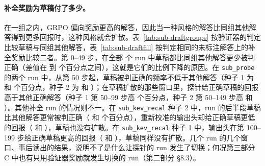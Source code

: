 \paragraph{补全奖励为草稿付了多少。} 在一组之内，GRPO 偏向奖励更高的解答，因此当一种风格的解答比同组其他解答得到更多回报时，这种风格就会扩散。表~\ref{tab:sub-draftgroups} 按验证器的判定比较草稿与同组其他解答，表~\ref{tab:sub-draftfill} 按判定相同的未标注解答上的补全奖励比较二者。第 0--49 步，在全部  个 run 中草稿都比同组其他解答更少被判正确（差值在  到  个百分点之间），这就是它们的比例下降的原因。在 \texttt{sub\_probe} 的两个 run 中，从第 50 步起，草稿被判正确的频率不低于其他解答（种子 1 为  和  个百分点，种子 2 为  和 ）；在草稿扩散的那些窗口里，探针给正确草稿的回报高于其他正确解答（种子 1 第 50--99 步高  个百分点，种子 2 第 50--149 步高  和 ）。其他补全 run 的情况则不一。在 \texttt{sub\_kev\_recal} 种子 2 中，run 的后半段草稿比其他解答更常被判正确（ 和  个百分点），重新校准的输出头却给正确草稿更低的回报（ 和 ），草稿也没有扩散。在 \texttt{sub\_kev\_recal} 种子 1 中，输出头在第 100--199 步给正确草稿更高的回报（ 和 ），草稿同样没有扩散。几个 run 的几个窗口、事后读出的结果，说明不了是什么让探针的 run 发生了切换；何况第三部分 C 中也有只用验证器奖励就发生切换的 run（第二部分 \S8.3）。

\begin{table}[t]
\centering\small

\caption{以非正式草稿开头的训练解答，按 50 步的窗口：它们所占比例，以及 $\Delta$ right：在同时含有两类解答的组上取平均的、草稿被验证器判为正确的比例减去同组其他解答的这一比例（百分点）。}
\label{tab:sub-draftgroups}
\end{table}

\begin{table}[t]
\centering\small

\caption{以非正式草稿开头的未标注训练解答的补全奖励，减去同组中判定相同（right 或 wrong）的其他未标注解答的补全奖励，按 50 步的窗口，在同时含有两者的组上取平均（百分点）；--- 表示没有这样的组。}
\label{tab:sub-draftfill}
\end{table}

